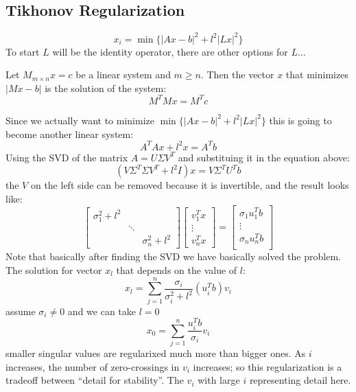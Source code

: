 \subsection{Tikhonov Regularization}
$$x_i = \min\{|Ax-b|^2 + l^2|Lx|^2 \}$$
To start $L$ will be the identity operator, there are other options for $L$...
\begin{teorema}
Let $M_{m\times n}x=c$ be a linear system and $m\geq n$. Then the vector $x$ that minimizes $|Mx-b|$ is the solution of the system: $$M^T M x= M^Tc$$
\end{teorema}
Since we actually want to minimize $\min\{|Ax-b|^2 + l^2|Lx|^2 \}$ this is going to become another linear system:
$$ A^TAx+l^2x=A^Tb$$
Using the SVD of the matrix $A=U\Sigma V^T$ and substituing it in the equation above:
$$(V\Sigma^T \Sigma V^T + l^2 I)x = V\Sigma^TU^Tb$$
the $V$ on the left side can be removed because it is invertible, and the result looks like:
\begin{equation*}
\begin{bmatrix}
\sigma^2_1 + l^2 & & \\
        & \ddots & \\
     & & \sigma_n^2+l^2
\end{bmatrix}
\begin{bmatrix}
v_1^T x \\
\vdots \\
v_n^T x
\end{bmatrix} =
\begin{bmatrix}
\sigma_1 u_1^T b\\
\vdots\\
\sigma_n u_n^T b\\
\end{bmatrix}
\end{equation*}
Note that basically after finding the SVD we have basically solved the problem. The solution for vector $x_l$ that depends on the value of $l$:
$$x_l = \sum_{j=1}^n \frac{\sigma_i}{\sigma_i^2 + l^2} (u^T_i b)v_i $$
assume $\sigma_i \neq 0$ and we can take $l=0$
$$x_0 = \sum_{j=1}^n \frac{u^T_i b}{\sigma_i } v_i $$
smaller singular values are regularixed much more than bigger ones. As $i$ increases, the number of zero-crossings in $v_i$ increases; so this regularization is a tradeoff between ``detail for stability''. The $v_i$ with large $i$ representing detail here.

